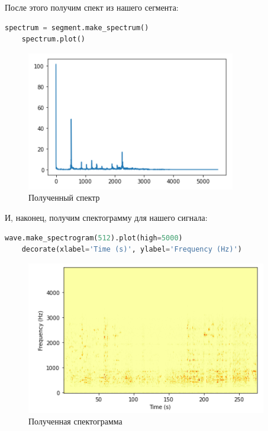 \documentclass[a4paper]{article}
\begin{document}
            После этого получим спект из нашего сегмента:
            
\begin{lstlisting}[language=Python, caption= Получение спектра из сегмента]
    spectrum = segment.make_spectrum()
    spectrum.plot()
\end{lstlisting}   
            
             \begin{figure}[H]
                \centering
                \includegraphics{ex_4_wave_spectr.png}
                \caption{Полученный спектр}
                \label{fig:ex_4_wave_spectr}
            \end{figure}
            
            И, наконец, получим спектограмму для нашего сигнала:
            
\begin{lstlisting}[language=Python, caption= Получение спектограммы]
    wave.make_spectrogram(512).plot(high=5000)
    decorate(xlabel='Time (s)', ylabel='Frequency (Hz)')
\end{lstlisting}   
            
             \begin{figure}[H]
                \centering
                \includegraphics{ex_4_spectogramma.png}
                \caption{Полученная спектограмма}
                \label{fig:ex_4_spectogramma}
            \end{figure}
            
\end{document}
